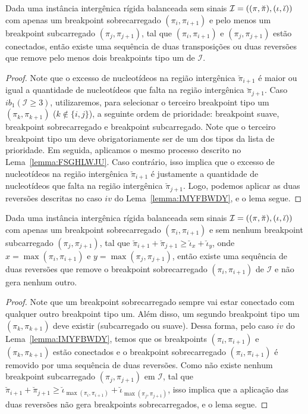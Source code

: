 \begin{lemma}\label{lemma:RHTVEKOL}
Dada uma instância intergênica rígida balanceada sem sinais $\mathcal{I}=((\pi,\breve\pi),\break(\iota,\breve\iota))$ com apenas um breakpoint sobrecarregado $(\pi_i,\pi_{i+1})$ e pelo menos um breakpoint subcarregado $(\pi_j,\pi_{j+1})$, tal que $(\pi_i,\pi_{i+1})$ e $(\pi_j,\pi_{j+1})$ estão conectados, então existe uma sequência de duas transposições ou duas reversões que remove pelo menos dois breakpoints tipo um de $\mathcal{I}$.
\end{lemma}
\begin{proof}
Note que o excesso de nucleotídeos na região intergênica $\breve\pi_{i+1}$ é maior ou igual a quantidade de nucleotídeos que falta na região intergênica $\breve\pi_{j+1}$. Caso $ib_1(\mathcal{I} \ge 3)$, utilizaremos, para selecionar o terceiro breakpoint tipo um $(\pi_k,\pi_{k+1})$ ($k \notin \{i,j\}$), a seguinte ordem de prioridade: breakpoint suave, breakpoint sobrecarregado e breakpoint subcarregado. Note que o terceiro breakpoint tipo um deve obrigatoriamente ser de um dos tipos da lista de prioridade. Em seguida, aplicamos o mesmo processo descrito no Lema~\ref{lemma:FSGHLWJU}. Caso contrário, isso implica que o excesso de nucleotídeos na região intergênica $\breve\pi_{i+1}$ é justamente a quantidade de nucleotídeos que falta na região intergênica $\breve\pi_{j+1}$. Logo, podemos aplicar as duas reversões descritas no caso $iv$ do Lema~\ref{lemma:IMYFBWDY}, e o lema segue.
\end{proof}

\begin{lemma}\label{lemma:ICDGSTEE}
Dada uma instância intergênica rígida balanceada sem sinais $\mathcal{I}=((\pi,\breve\pi),\break(\iota,\breve\iota))$ com apenas um breakpoint sobrecarregado $(\pi_i,\pi_{i+1})$ e sem nenhum breakpoint subcarregado $(\pi_j,\pi_{j+1})$, tal que $\breve\pi_{i+1} + \breve\pi_{j+1} \ge \breve\iota_{x} + \breve\iota_{y}$, onde $x = \max(\pi_i,\pi_{i+1})$ e $y=\max(\pi_j,\pi_{j+1})$, então existe uma sequência de duas reversões que remove o breakpoint sobrecarregado $(\pi_i,\pi_{i+1})$ de $\mathcal{I}$ e não gera nenhum outro.
\end{lemma}
\begin{proof}
Note que um breakpoint sobrecarregado sempre vai estar conectado com qualquer outro breakpoint tipo um. Além disso, um segundo breakpoint tipo um $(\pi_k,\pi_{k+1})$ deve existir (subcarregado ou suave). Dessa forma, pelo caso $iv$ do Lema~\ref{lemma:IMYFBWDY}, temos que os breakpoints $(\pi_i,\pi_{i+1})$ e $(\pi_k,\pi_{k+1})$ estão conectados e o breakpoint sobrecarregado $(\pi_i,\pi_{i+1})$ é removido por uma sequência de duas reversões. Como não existe nenhum breakpoint subcarregado $(\pi_j,\pi_{j+1})$ em $\mathcal{I}$, tal que $\breve\pi_{i+1} + \breve\pi_{j+1} \ge \breve\iota_{\max(\pi_i,\pi_{i+1})} + \breve\iota_{\max(\pi_j,\pi_{j+1})}$, isso implica que a aplicação das duas reversões não gera breakpoints sobrecarregados, e o lema segue.
\end{proof}

